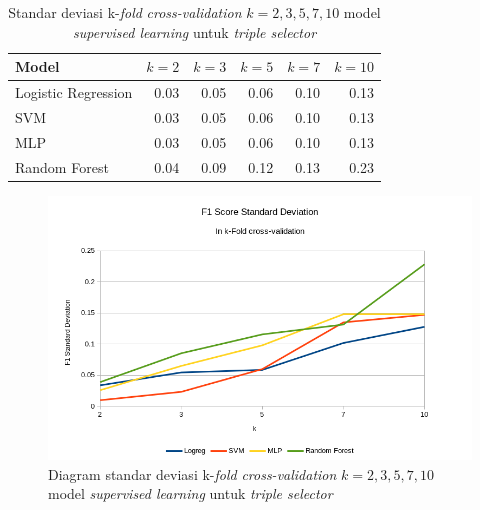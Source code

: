 \begin{table}
	\caption{Standar deviasi k-\textit{fold} \textit{cross-validation} $k={2, 3, 5, 7, 10}$ model \textit{supervised learning} untuk \textit{triple selector}}
	\label{tab:models_performance_stdev}
	\centering
	\begin{tabular}{l r r r r r}
		\hline
		\textbf{Model} & $k=2$ & $k=3$ & $k=5$ & $k=7$ & $k=10$ \\
		\hline
		Logistic Regression & 0.03 & 0.05 & 0.06 & 0.10 & 0.13 \\
		SVM & 0.03 & 0.05 & 0.06 & 0.10 & 0.13 \\
		MLP & 0.03 & 0.05 & 0.06 & 0.10 & 0.13 \\
		Random Forest & 0.04 & 0.09 & 0.12 & 0.13 & 0.23 \\
		\hline
	\end{tabular}
\end{table}

\begin{figure}
	\includegraphics[width=\textwidth]{../images/models_performance_stdev.png}
	\caption{Diagram standar deviasi k-\textit{fold} \textit{cross-validation} $k={2, 3, 5, 7, 10}$ model \textit{supervised learning} untuk \textit{triple selector}}
	\label{fig:models_performance_stdev}
\end{figure}

